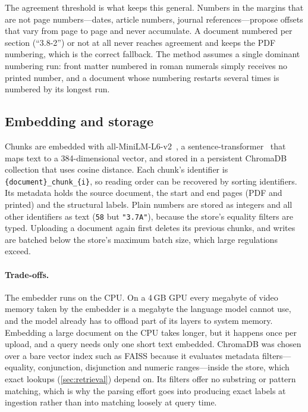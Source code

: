 The agreement threshold is what keeps this general. Numbers in the margins
that are not page numbers---dates, article numbers, journal
references---propose offsets that vary from page to page and never
accumulate. A document
numbered per section (``3.8-2'') or not at all never reaches agreement and
keeps the PDF numbering, which is the correct fallback. The method assumes a
single dominant numbering run: front matter numbered in roman numerals simply
receives no printed number, and a document whose numbering restarts several
times is numbered by its longest run.

\subsection{Embedding and storage}

Chunks are embedded with all-MiniLM-L6-v2~\cite{wang2020minilm}, a
sentence-transformer~\cite{reimers2019sbert} that maps text to a
384-dimensional vector, and stored in a persistent ChromaDB collection that
uses cosine distance. Each chunk's identifier is
\texttt{\{document\}\_chunk\_\{i\}}, so reading order can be recovered by
sorting identifiers. Its metadata holds the source document, the start and end
pages (PDF and printed) and the structural labels. Plain numbers are stored as
integers and all other identifiers as text (\texttt{58} but \texttt{"3.7A"}),
because the store's equality filters are typed. Uploading a document again
first deletes its previous chunks, and writes are batched below the store's
maximum batch size, which large regulations exceed.

\paragraph{Trade-offs.} The embedder runs on the CPU. On a 4\,GB GPU every
megabyte of video memory taken by the embedder is a megabyte the language
model cannot use, and the model already has to offload part of its layers to
system memory. Embedding a large document on the CPU takes longer, but it
happens once per upload, and a query needs only one short text embedded.
ChromaDB was chosen over a bare vector index such as FAISS because it
evaluates metadata filters---equality, conjunction, disjunction and numeric
ranges---inside the store, which exact lookups (\cref{sec:retrieval}) depend
on. Its filters offer no substring or pattern matching, which is why the
parsing effort goes into producing exact labels at ingestion rather than into
matching loosely at query time.
